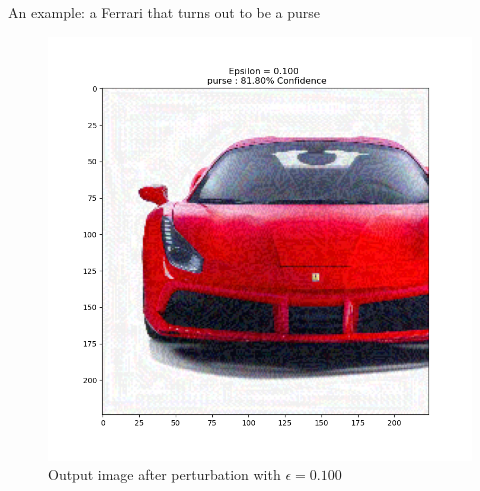 \documentclass[8pt]{beamer}
\begin{document}
\begin{frame}{An example: a Ferrari that turns out to be a purse}
\begin{figure} 
    \includegraphics[scale=0.3]{images/output_2.png}
    \vspace*{-5mm}
    \caption{Output image after perturbation with $\epsilon=0.100$}
\end{figure}
\end{frame}
\end{document}
